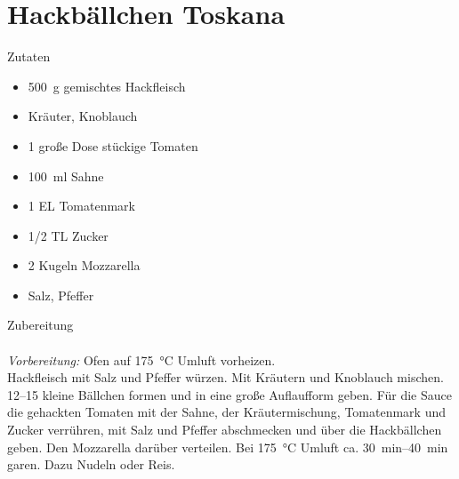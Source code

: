 \section*{Hackbällchen Toskana}
\ihead{}\ohead{}
\cfoot{}
{\Large Zutaten}
\begin{multicols}{2}
\begin{itemize}
    \item \SI{500}{g} gemischtes Hackfleisch
    \item Kräuter, Knoblauch
    \item \num{1} große Dose stückige Tomaten
    \item \SI{100}{ml} Sahne
    \item \num{1} EL Tomatenmark
    \item \num{1/2} TL Zucker
    \item \num{2} Kugeln Mozzarella
    \item Salz, Pfeffer
\end{itemize}
\end{multicols}
\noindent
{\Large Zubereitung}\\
\\
\textit{Vorbereitung:} Ofen auf \SI{175}{\celsius} Umluft vorheizen.\\
Hackfleisch mit Salz und Pfeffer würzen.
Mit Kräutern und Knoblauch mischen.
\numrange{12}{15} kleine Bällchen formen und in eine große Auflaufform geben.
Für die Sauce die gehackten Tomaten mit der Sahne, der Kräutermischung, Tomatenmark und Zucker verrühren, mit Salz und Pfeffer abschmecken und über die Hackbällchen geben.
Den Mozzarella darüber verteilen.
Bei \SI{175}{\celsius} Umluft ca. \SIrange{30}{40}{min} garen.
Dazu Nudeln oder Reis.